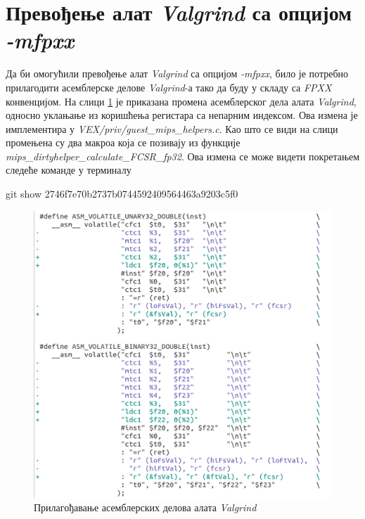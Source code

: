 \documentclass[12pt,oneside]{memoir}
\begin{document}
\section{Превођење алат \textit{Valgrind} са опцијом \textit{-mfpxx}}

\indent Да би омогућили превођење алат \textit{Valgrind} са опцијом \textit{-mfpxx}, било је потребно прилагодити асемблерске делове \textit{Valgrind}-а тако да буду у складу са \textit{FPXX} конвенцијом. На слици \ref{fig:asm} је приказана промена асемблерског дела алата \textit{Valgrind}, односно уклањање из коришћења регистара са непарним индексом. Ова измена је имплементира у \textit{VEX/priv/guest\_mips\_helpers.c}. Као што се види на слици промењена су два макроа која се позивају из функције \textit{mips\_dirtyhelper\_calculate\_FCSR\_fp32}. Ова измена се може видети покретањем следеће команде у терминалу

\begin{center}
git show 2746f7e70b2737b0744592409564463a9203c5f0
\end{center}

\begin{figure}[h!]
\begin{center}
\includegraphics[scale=0.75]{slika26.png}
\end{center}
\caption{Прилагођавање асемблерских делова алата \textit{Valgrind}}
\label{fig:asm}
\end{figure}
\end{document}
